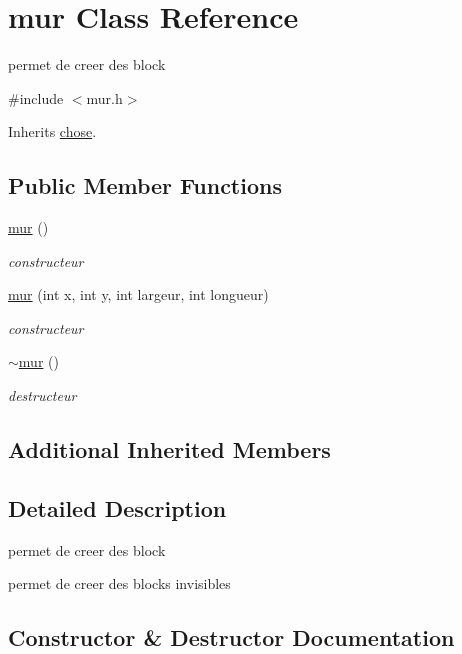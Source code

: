 \hypertarget{classmur}{}\section{mur Class Reference}
\label{classmur}


permet de creer des block  




{\ttfamily \#include $<$mur.\+h$>$}



Inherits \mbox{\hyperlink{classchose}{chose}}.

\subsection*{Public Member Functions}
\begin{DoxyCompactItemize}
\item 
\mbox{\hyperlink{classmur_a3a7ce001dee52d7c355f147180ce3dd3}{mur}} ()
\begin{DoxyCompactList}\small\item\em constructeur \end{DoxyCompactList}\item 
\mbox{\hyperlink{classmur_ab583d73ab5e4f47ec8b7c5277de7965d}{mur}} (int x, int y, int largeur, int longueur)
\begin{DoxyCompactList}\small\item\em constructeur \end{DoxyCompactList}\item 
\mbox{\hyperlink{classmur_af97abbec34c1427a4b80afe684473397}{$\sim$mur}} ()
\begin{DoxyCompactList}\small\item\em destructeur \end{DoxyCompactList}\end{DoxyCompactItemize}
\subsection*{Additional Inherited Members}


\subsection{Detailed Description}
permet de creer des block 

permet de creer des blocks invisibles 

\subsection{Constructor \& Destructor Documentation}
\mbox{\label{classmur_a3a7ce001dee52d7c355f147180ce3dd3}} 
